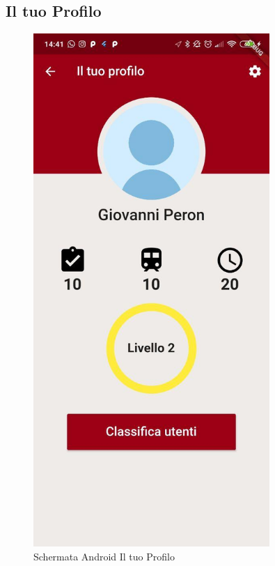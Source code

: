 \subsection{Il tuo Profilo}
\begin{minipage}{0.45\textwidth}
	\begin{figure}[H]
		\centering
		\includegraphics[width=0.8\textwidth]{immagini/profile.jpg}
		\caption{Schermata Android Il tuo Profilo}
	\end{figure}
\end{minipage}
\hfill
